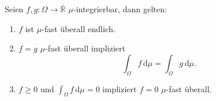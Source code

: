 \begin{satz}\label{S7}
	Seien $f,g \colon \Omega \rightarrow \overline{\mathbb{R}}$ $\mu$-integrierbar, dann gelten:
	\begin{enumerate}[label=(\roman*)]
		\item $f$ ist $\mu$-fast überall endlich.
		\item $f=g$ $\mu$-fast überall impliziert
		\[ \int_{\Omega} f \,\mathrm{d}\mu = \int_{\Omega} g\, \mathrm{d}\mu. \]
		\item $f \geq 0$ und $ \int_{\Omega} f\, \mathrm{d} \mu=0$ impliziert $f = 0$ $\mu$-fast überall.
	\end{enumerate}
\end{satz}

